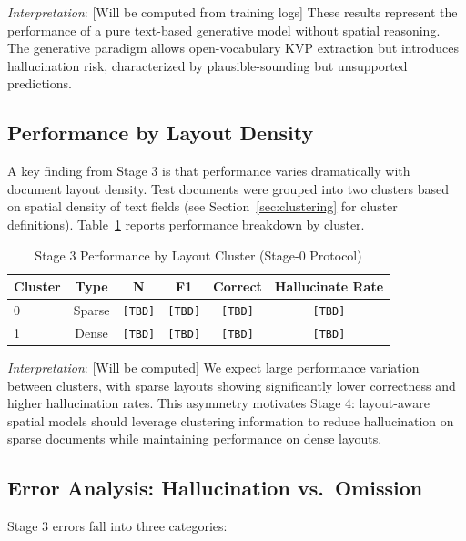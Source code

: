 \textit{Interpretation}: [Will be computed from training logs] These results represent the performance of a pure text-based generative model without spatial reasoning. The generative paradigm allows open-vocabulary KVP extraction but introduces hallucination risk, characterized by plausible-sounding but unsupported predictions.

\subsection{Performance by Layout Density}
\label{sec:stage3_by_cluster}

A key finding from Stage 3 is that performance varies dramatically with document layout density. Test documents were grouped into two clusters based on spatial density of text fields (see Section~\ref{sec:clustering} for cluster definitions). Table~\ref{tab:stage3_cluster_performance} reports performance breakdown by cluster.

\begin{table}[ht]
\centering
\caption{Stage 3 Performance by Layout Cluster (Stage-0 Protocol)}
\label{tab:stage3_cluster_performance}
\begin{tabular}{@{}lccccc@{}}
\toprule
\textbf{Cluster} & \textbf{Type} & \textbf{N} & \textbf{F1} & \textbf{Correct} & \textbf{Hallucinate Rate} \\
\midrule
0 & Sparse & \texttt{[TBD]} & \texttt{[TBD]} & \texttt{[TBD]} & \texttt{[TBD]} \\
1 & Dense & \texttt{[TBD]} & \texttt{[TBD]} & \texttt{[TBD]} & \texttt{[TBD]} \\
\bottomrule
\end{tabular}
\end{table}

\textit{Interpretation}: [Will be computed] We expect large performance variation between clusters, with sparse layouts showing significantly lower correctness and higher hallucination rates. This asymmetry motivates Stage 4: layout-aware spatial models should leverage clustering information to reduce hallucination on sparse documents while maintaining performance on dense layouts.

\subsection{Error Analysis: Hallucination vs.\ Omission}
\label{sec:stage3_error_analysis}

Stage 3 errors fall into three categories:

